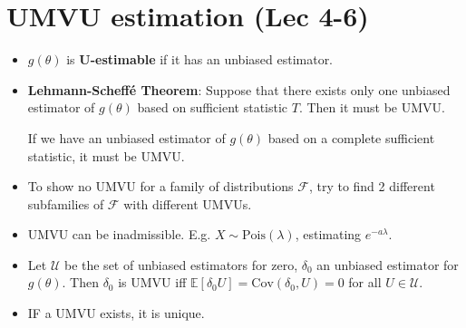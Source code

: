 \documentclass[twoside]{article}
\newcommand\bbE{\mathbb{E}}
\newcommand\calF{\mathcal{F}}
\newcommand\calU{\mathcal{U}}
\newcommand\dlt{\delta}
\newcommand\lmb{\lambda}
\def\t{\theta}
\begin{document}
\section*{UMVU estimation (Lec 4-6)}
\begin{itemize}
\item $g(\t)$ is \textbf{U-estimable} if it has an unbiased estimator.

\item \textbf{Lehmann-Scheff\'{e} Theorem}: Suppose that there exists only one unbiased estimator of $g(\t)$ based on sufficient statistic $T$. Then it must be UMVU.

If we have an unbiased estimator of $g(\t)$ based on a complete sufficient statistic, it must be UMVU.

\item To show no UMVU for a family of distributions $\calF$, try to find 2 different subfamilies of $\calF$ with different UMVUs.

\item UMVU can be inadmissible. E.g. $X \sim \text{Pois}(\lmb)$, estimating $e^{-a\lmb}$.

\item Let $\calU$ be the set of unbiased estimators for zero, $\dlt_0$ an unbiased estimator for $g(\t)$. Then $\dlt_0$ is UMVU iff $\bbE [\dlt_0 U] = \text{Cov}(\dlt_0, U) = 0$ for all $U \in \calU$.

\item IF a UMVU exists, it is unique.

\end{itemize}

\end{document}
